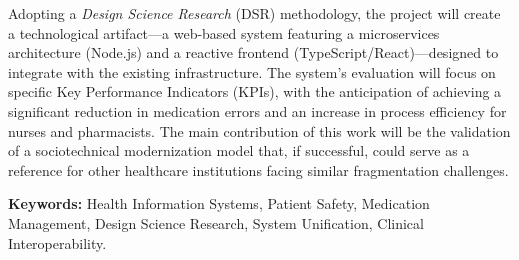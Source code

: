 Adopting a \textit{Design Science Research} (DSR) methodology, the project will create a technological artifact—a web-based system featuring a microservices architecture (Node.js) and a reactive frontend (TypeScript/React)—designed to integrate with the existing infrastructure. The system's evaluation will focus on specific Key Performance Indicators (KPIs), with the anticipation of achieving a significant reduction in medication errors and an increase in process efficiency for nurses and pharmacists. The main contribution of this work will be the validation of a sociotechnical modernization model that, if successful, could serve as a reference for other healthcare institutions facing similar fragmentation challenges.

\vspace{6mm}
\noindent\textbf{Keywords:} Health Information Systems, Patient Safety, Medication Management, Design Science Research, System Unification, Clinical Interoperability. 